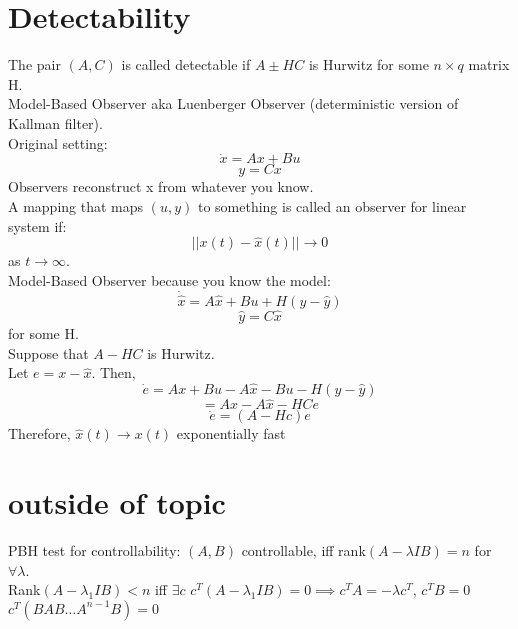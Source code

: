 \documentclass{article}
\begin{document}
\section{Detectability}
The pair $(A,C)$ is called detectable if $A\pm HC$ is Hurwitz for some $n\times q$ matrix H.\\
Model-Based Observer aka Luenberger Observer (deterministic version of Kallman filter).\\
Original setting:
\[\dot{x}=Ax+Bu\]
\[y=Cx\]
Observers reconstruct x from whatever you know.\\
A mapping that maps $(u,y)$ to something is called an observer for linear system if:
\[\lvert\lvert x(t)-\hat{x}(t)\rvert\rvert \to 0\]
as $t\to\infty$.\\
Model-Based Observer because you know the model:\\
\[\dot{\hat{x}}=A\hat{x}+Bu+H(y-\hat{y})\]
\[\hat{y}=C\hat{x}\]
for some H.\\

Suppose that $A-HC$ is Hurwitz.\\
Let $e=x-\hat{x}$. Then,
\[\dot{e}=Ax+Bu-A\hat{x}-Bu-H(y-\hat{y})\]
\[=Ax-A\hat{x}-HCe\]
\[\dot{e}=(A-Hc)e\]
Therefore, $\hat{x}(t)\to x(t)$ exponentially fast

\section{outside of topic}
PBH test for controllability:
$(A,B)$ controllable, iff rank$(A-\lambda I B)=n$ for $\forall \lambda$.\\
Rank$(A-\lambda_1 I B)<n$ iff $\exists c$   $c^T(A-\lambda_1 I B)=0\implies c^TA=-\lambda c^T$,  $c^TB=0$\\
$c^T(B AB \dots A^{n-1}B)=0$\\
\end{document}
